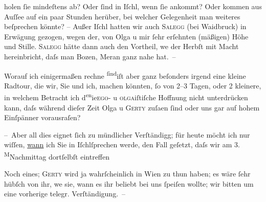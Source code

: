                holen{ }ſie mindeſtens ab? Oder{ }ſind in Iſchl, wenn{ }ſie ankommt? Oder kommen aus Auſſee auf ein paar
               Stunden herüber, bei welcher Gelegenheit man weiteres beſprechen könnte? – Außer Iſchl hatten wir auch \textsc{Salegg} (bei Waidbruck) in {\pb}Erwägung gezogen, wegen der, von Olga u mir{ }ſehr erſehnten (mäßigen) Höhe und Stille. \textsc{Salegg} hätte dann auch den Vortheil, we{\geminationn} der
                  Herbſt mit Macht hereinbricht, daſs man Bozen, Meran ganz nahe
               hat. –\pend
           
\pstart
           Worauf ich einigermaßen rechne \substVorne{}\textsuperscript{ſind}\substDazwischen{}iſt\substHinten{} aber ganz beſonders irgend eine kleine Radtour, die wir, Sie und ich, machen
               könnten,{ }ſo von 2–3 Tagen, oder 2 kleinere, {\pb}in welchem
               Betracht ich d\substVorne{}\textsuperscript{en}\substDazwischen{}ie\substHinten{}{ }\textsc{ego}- u \textsc{olga}iſtiſche Hoffnung nicht unterdrücken kann, daſs während dieſer Zeit Olga u \textsc{Gerty} zuſa{\geminationm}en{ }ſind oder uns gar auf hohem Einſpänner
               vorausraſen?\pend
           
\pstart
           – Aber all dies eignet{ }ſich zu mündlicher Verſtändigg; für heute möcht ich nur
               wiſſen, \uline{wann} ich Sie in Iſchlſprechen werde, den Fall geſetzt, daſs wir am
                  3.{ }\substVorne{}\textsuperscript{M}\substDazwischen{}Na\substHinten{}chmittag dortſelbſt eintreffen\pend
           
\pstart
           {\pb}Noch eines; \textsc{Gerty} wird ja wahrſcheinlich in Wien zu thun
               haben; es wäre{ }ſehr hübſch von ihr, we{\geminationn}{ }sie, wann es ihr beliebt bei uns{ }ſpeiſen wollte;
               wir bitten um eine vorherige telegr. Verſtändigung. –\pend
           
